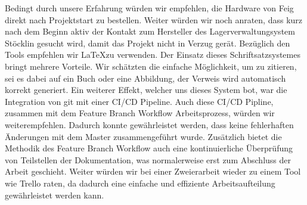 Bedingt durch unsere Erfahrung würden wir empfehlen, die Hardware von Feig direkt nach Projektstart zu bestellen. Weiter würden wir noch anraten, dass kurz nach dem Beginn aktiv der Kontakt zum Hersteller des Lagerverwaltungsystem Stöcklin gesucht wird, damit das Projekt nicht in Verzug gerät. Bezüglich den Tools empfehlen wir \LaTeX zu verwenden. Der Einsatz dieses Schriftsatzsystemes bringt mehrere Vorteile. Wir schätzten die einfache Möglichkeit, um zu zitieren, sei es dabei auf ein Buch oder eine Abbildung, der Verweis wird automatisch korrekt generiert. Ein weiterer Effekt, welcher uns dieses System bot, war die Integration von git mit einer CI/CD Pipeline. Auch diese CI/CD Pipline, zusammen mit dem Feature Branch Workflow Arbeitsprozess, würden wir weiterempfehlen. Dadurch konnte gewährleistet werden, dass keine fehlerhaften Änderungen mit dem Master zusammengeführt wurde. Zusätzlich bietet die Methodik des Feature Branch Workflow auch eine kontinuierliche Überprüfung von Teilstellen der Dokumentation, was normalerweise erst zum Abschluss der Arbeit geschieht. Weiter würden wir bei einer Zweierarbeit wieder zu einem Tool wie Trello raten, da dadurch eine einfache und effiziente Arbeitsaufteilung gewährleistet werden kann.
